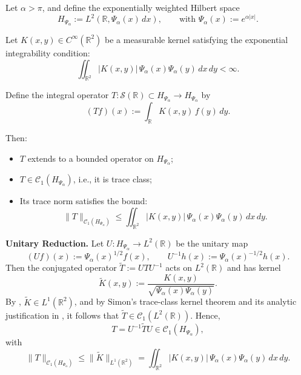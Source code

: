 \begin{lemma}
\label{lem:trace_class_via_weighted_L1}
Let \( \alpha > \pi \), and define the exponentially weighted Hilbert space
\[
H_{\Psi_\alpha} := L^2\left(\mathbb{R}, \Psi_\alpha(x)\, dx\right), \qquad \text{with } \Psi_\alpha(x) := e^{\alpha |x|}.
\]

Let \( K(x,y) \in C^\infty(\mathbb{R}^2) \) be a measurable kernel satisfying the exponential integrability condition:
\[
\iint_{\mathbb{R}^2} |K(x,y)|\, \Psi_\alpha(x) \Psi_\alpha(y)\, dx\, dy < \infty.
\]

Define the integral operator \( T \colon \mathcal{S}(\mathbb{R}) \subset H_{\Psi_\alpha} \to H_{\Psi_\alpha} \) by
\[
(Tf)(x) := \int_{\mathbb{R}} K(x,y)\, f(y)\, dy.
\]

Then:
\begin{itemize}
    \item \( T \) extends to a bounded operator on \( H_{\Psi_\alpha} \);
    \item \( T \in \mathcal{C}_1(H_{\Psi_\alpha}) \), i.e., it is trace class;
    \item Its trace norm satisfies the bound:
    \[
    \|T\|_{\mathcal{C}_1(H_{\Psi_\alpha})} \le \iint_{\mathbb{R}^2} |K(x,y)|\, \Psi_\alpha(x)\Psi_\alpha(y)\, dx\, dy.
    \]
\end{itemize}

\medskip
\noindent\textbf{Unitary Reduction.}
Let \( U \colon H_{\Psi_\alpha} \to L^2(\mathbb{R}) \) be the unitary map
\[
(Uf)(x) := \Psi_\alpha(x)^{1/2} f(x), \qquad U^{-1} h(x) := \Psi_\alpha(x)^{-1/2} h(x).
\]
Then the conjugated operator \( \widetilde{T} := U T U^{-1} \) acts on \( L^2(\mathbb{R}) \) and has kernel
\[
\widetilde{K}(x,y) := \frac{K(x,y)}{\sqrt{\Psi_\alpha(x)\Psi_\alpha(y)}}.
\]
By , \( \widetilde{K} \in L^1(\mathbb{R}^2) \), and by Simon’s trace-class kernel theorem \cite[Thm.~4.2]{Simon2005TraceIdeals} and its analytic justification in , it follows that \( \widetilde{T} \in \mathcal{C}_1(L^2(\mathbb{R})) \). Hence,
\[
T = U^{-1} \widetilde{T} U \in \mathcal{C}_1(H_{\Psi_\alpha}),
\]
with
\[
\|T\|_{\mathcal{C}_1(H_{\Psi_\alpha})} \le \| \widetilde{K} \|_{L^1(\mathbb{R}^2)} = \iint_{\mathbb{R}^2} |K(x,y)|\, \Psi_\alpha(x)\Psi_\alpha(y)\, dx\, dy.
\]
\end{lemma}
